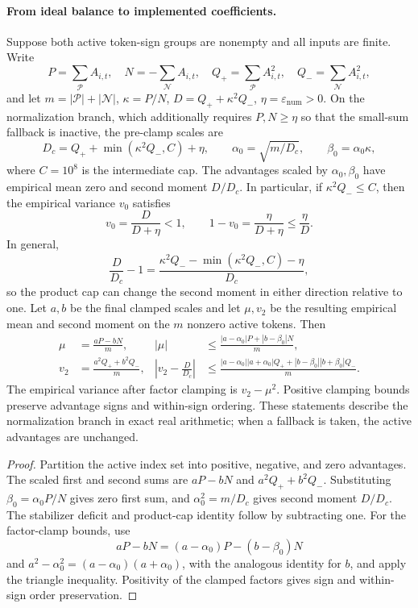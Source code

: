 \paragraph{From ideal balance to implemented coefficients.}
\begin{proposition}
\label{prop:normalization-safeguards}
Suppose both active token-sign groups are nonempty and all inputs are finite.
Write
\[
P=\sum_{\mathcal P}A_{i,t},\quad N=-\sum_{\mathcal N}A_{i,t},\quad
Q_+=\sum_{\mathcal P}A_{i,t}^2,\quad Q_-=\sum_{\mathcal N}A_{i,t}^2,
\]
and let $m=|\mathcal P|+|\mathcal N|$, $\kappa=P/N$,
$D=Q_++\kappa^2Q_-$, $\eta=\varepsilon_{\mathrm{num}}>0$.
On the normalization branch, which additionally requires $P,N\ge\eta$
so that the small-sum fallback is inactive, the pre-clamp scales are
\[
D_c=Q_++\min(\kappa^2Q_-,C)+\eta,\qquad
\alpha_0=\sqrt{m/D_c},\qquad \beta_0=\alpha_0\kappa,
\]
where $C=10^8$ is the intermediate cap. The advantages scaled by
$\alpha_0,\beta_0$ have empirical mean zero and second moment $D/D_c$. In particular, if
$\kappa^2Q_-\le C$, then the empirical variance $v_0$ satisfies
\begin{equation}
    v_0=\frac{D}{D+\eta}<1,\qquad
    1-v_0=\frac{\eta}{D+\eta}\le\frac{\eta}{D}.
    \label{eq:normalization-stabilizer-deficit}
\end{equation}
In general,
\[
    \frac{D}{D_c}-1
    =\frac{\kappa^2Q_- -\min(\kappa^2Q_-,C)-\eta}{D_c},
\]
so the product cap can change the second moment in either direction relative to one.
Let $a,b$ be the final clamped scales and let $\mu,v_2$ be the resulting
empirical mean and second moment on the $m$ nonzero active tokens. Then
\begin{align*}
    \mu&=\frac{aP-bN}{m},
    &|\mu|&\le\frac{|a-\alpha_0|P+|b-\beta_0|N}{m},\\
    v_2&=\frac{a^2Q_++b^2Q_-}{m},
    &\left|v_2-\frac{D}{D_c}\right|
    &\le\frac{|a-\alpha_0||a+\alpha_0|Q_+
               +|b-\beta_0||b+\beta_0|Q_-}{m}.
\end{align*}
The empirical variance after factor clamping is $v_2-\mu^2$.
Positive clamping bounds preserve advantage signs and within-sign ordering.
These statements describe the normalization branch in exact real arithmetic;
when a fallback is taken, the active advantages are unchanged.
\end{proposition}
\begin{proof}
Partition the active index set into positive, negative, and zero advantages.
The scaled first and second sums are $aP-bN$ and $a^2Q_++b^2Q_-$.
Substituting $\beta_0=\alpha_0P/N$ gives zero first sum, and
$\alpha_0^2=m/D_c$ gives second moment $D/D_c$.
The stabilizer deficit and product-cap identity follow by subtracting one.
For the factor-clamp bounds, use
\[
aP-bN=(a-\alpha_0)P-(b-\beta_0)N
\]
and $a^2-\alpha_0^2=(a-\alpha_0)(a+\alpha_0)$, with the analogous identity
for $b$, and apply the triangle inequality. Positivity of the clamped
factors gives sign and within-sign order preservation.
\end{proof}

